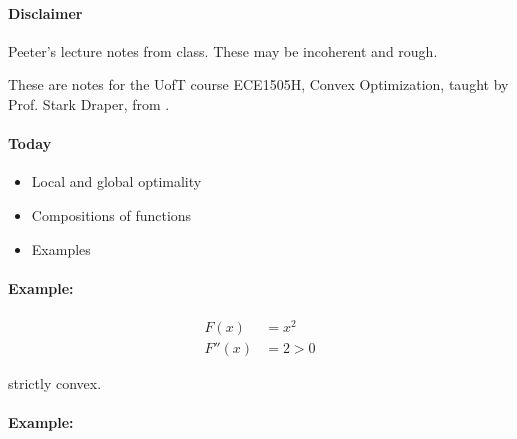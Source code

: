 
\renewcommand{\basename}{convexOptimization7}
\renewcommand{\dirname}{notes/ece1505/}
\newcommand{\keywords}{ECE1505H}


\usepackage{ece1505}
\usepackage{peeters_braket}
\usepackage{peeters_layout_exercise}
\usepackage{peeters_figures}
\usepackage{mathtools}
\usepackage{siunitx}

\beginArtNoToc
{}
\label{chap:convexOptimization7}

\paragraph{Disclaimer}

Peeter's lecture notes from class.  These may be incoherent and rough.

These are notes for the UofT course ECE1505H, Convex Optimization, taught by Prof. Stark Draper, from \citep{boyd2004convex}.

\paragraph{Today}

\begin{itemize}
\item Local and global optimality
\item Compositions of functions
\item Examples
\end{itemize}

\paragraph{Example:}

\begin{dmath}\label{eqn:convexOptimizationLecture7:20}
\begin{aligned}
F(x) &= x^2  \\
F''(x) &= 2 > 0
\end{aligned}
\end{dmath}

strictly convex.

\paragraph{Example:}

